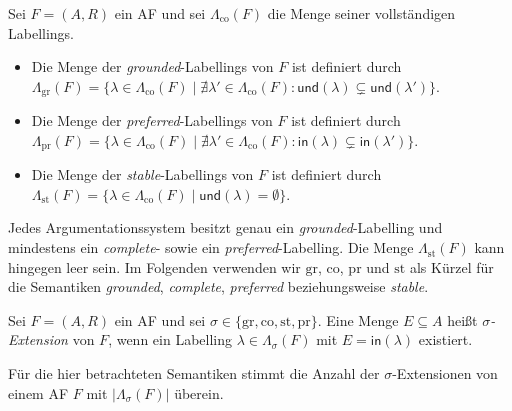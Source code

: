 \begin{Definition}
    \label{def:af-semantics}
    Sei \(F=(A,R)\) ein AF und sei \(\Lambda_{\mathrm{co}}(F)\) die Menge seiner vollständigen Labellings.  
    \begin{itemize}
        \item Die Menge der \emph{grounded}-Labellings von \(F\) ist definiert durch 
        \(\Lambda_{\mathrm{gr}}(F)=\{\lambda\in\Lambda_{\mathrm{co}}(F)
        \mid\nexists\lambda'\in\Lambda_{\mathrm{co}}(F):\mathsf{und}
        (\lambda)\subsetneq\mathsf{und}(\lambda')\}\). 
        \item Die Menge der \emph{preferred}-Labellings von \(F\) ist definiert durch 
        \(\Lambda_{\mathrm{pr}}(F)=\{\lambda\in\Lambda_{\mathrm{co}}(F)
        \mid\nexists\lambda'\in\Lambda_{\mathrm{co}}(F):\mathsf{in}
        (\lambda)\subsetneq\mathsf{in}(\lambda')\}\). 
        \item Die Menge der \emph{stable}-Labellings von \(F\) ist definiert durch 
        \(\Lambda_{\mathrm{st}}(F)=\{\lambda\in\Lambda_{\mathrm{co}}
        (F)\mid\mathsf{und}(\lambda)=\emptyset\}\).
    \end{itemize}
\end{Definition}
Jedes Argumentationssystem besitzt genau ein \emph{grounded}-Labelling und
mindestens ein \emph{complete}- sowie ein \emph{preferred}-Labelling. Die Menge
\(\Lambda_{\mathrm{st}}(F)\) kann hingegen leer sein.
Im Folgenden verwenden wir
\(\mathrm{gr}\), \(\mathrm{co}\), \(\mathrm{pr}\) und \(\mathrm{st}\)
als Kürzel für die Semantiken
\emph{grounded}, \emph{complete}, \emph{preferred}
beziehungsweise \emph{stable}.

\begin{Definition}
    \label{def:af-extensions}
    Sei \(F=(A,R)\) ein AF und sei
    \(\sigma\in\{\mathrm{gr},\mathrm{co},\mathrm{st},\mathrm{pr}\}\).
    Eine Menge \(E\subseteq A\) heißt \emph{\(\sigma\)-Extension} von \(F\),
    wenn ein Labelling \(\lambda\in\Lambda_{\sigma}(F)\) mit
    \(E=\mathsf{in}(\lambda)\) existiert.
\end{Definition}
Für die hier betrachteten Semantiken stimmt die Anzahl der 
\(\sigma\)-Extensionen von einem AF \(F\) mit 
\(\lvert\Lambda_{\sigma}(F)\rvert\) überein.

